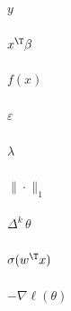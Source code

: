 \documentclass{article}
\begin{document}
\Large
\noindent
$y$ \\ \\ 
$x^\T \beta$ \\ \\
$f(x)$ \\ \\ 
$\varepsilon$ \\ \\
$\lambda$ \\ \\ 
$\|\cdot\|_1$ \\ \\
$\Delta^k \, \theta$ \\ \\
$\sigma(w^\T x)$ \\ \\
$-\nabla \ell(\theta)$ \\ \\


      
\end{document}
